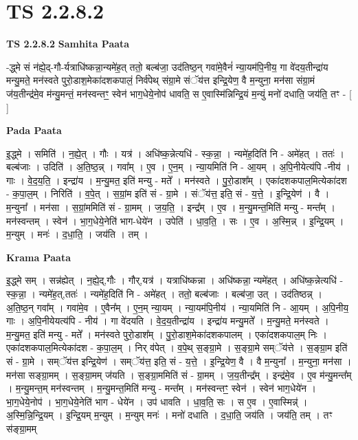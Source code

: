 \documentclass[17pt]{extarticle}
\begin{document}
\section{ TS 2.2.8.2 }

\textbf{TS 2.2.8.2 } \newline
\textbf{Samhita Paata} \newline

-द्ध्मे सं न॑ह्ये॒द्-गौ-र्यत्राधि॑ष्कन्ना॒न्यमे॑ह॒त् ततो॒ बल्ब॑जा॒ उद॑तिष्ठ॒न् गवा॑मे॒वैनं॑ न्या॒यम॑पि॒नीय॒ गा वे॑दय॒तीन्द्रा॑य मन्यु॒मते॒ मन॑स्वते पुरो॒डाश॒मेका॑दशकपालं॒ निर्व॑पेथ् संग्रा॒मे संॅय॑त्त इन्द्रि॒येण॒ वै म॒न्युना॒ मन॑सा संग्रा॒मं ज॑य॒तीन्द्र॑मे॒व म॑न्यु॒मन्तं॒ मन॑स्वन्तꣳ॒॒ स्वेन॑ भाग॒धेये॒नोप॑ धावति॒ स ए॒वास्मि॑न्निन्द्रि॒यं म॒न्युं मनो॑ दधाति॒ जय॑ति॒ तꣳ - [  ] \newline

\textbf{Pada Paata} \newline

इ॒द्ध्मे । समिति॑ । न॒ह्ये॒त् । गौः । यत्र॑ । अधि॑ष्क॒न्नेत्यधि॑ - स्क॒न्ना॒ । न्यमे॑ह॒दिति॑ नि - अमे॑हत् । ततः॑ । बल्ब॑जाः । उदिति॑ । अ॒ति॒ष्ठ॒न्न् । गवा᳚म् । ए॒व । ए॒न॒म् । न्या॒यमिति॑ नि - आ॒यम् । अ॒पि॒नीयेत्य॑पि -नीय॑ । गाः । वे॒द॒य॒ति॒ । इन्द्रा॑य । म॒न्यु॒मत॒ इति॑ मन्यु - मते᳚ । मन॑स्वते । पु॒रो॒डाश᳚म् । एका॑दशकपाल॒मित्येका॑दश - क॒पा॒ल॒म् । निरिति॑ । व॒पे॒त् । स॒ग्रां॒म इति॑ सं - ग्रा॒मे । संॅय॑त्त॒ इति॒ सं - य॒त्ते॒ । इ॒न्द्रि॒येण॑ । वै । म॒न्युना᳚ । मन॑सा । स॒ग्रां॒ममिति॑ सं - ग्रा॒मम् । ज॒य॒ति॒ । इन्द्र᳚म् । ए॒व । म॒न्यु॒मन्त॒मिति॑ मन्यु - मन्त᳚म् । मन॑स्वन्तम् । स्वेन॑ । भा॒ग॒धेये॒नेति॑ भाग-धेये॑न । उपेति॑ । धा॒व॒ति॒ । सः । ए॒व । अ॒स्मि॒न्न् । इ॒न्द्रि॒यम् । म॒न्युम् । मनः॑ । द॒धा॒ति॒ । जय॑ति । तम् ।  \newline


\textbf{Krama Paata} \newline

इ॒द्ध्मे सम् । सन्न॑ह्येत् । न॒ह्ये॒द्,गौः । गौर्,यत्र॑ । यत्राधि॑ष्कन्ना । अधि॑ष्कन्ना॒ न्यमे॑हत् । अधि॑ष्क॒न्नेत्यधि॑ - स्क॒न्ना॒ । न्यमे॑ह॒त्,ततः॑ । न्यमे॑ह॒दिति॑ नि - अमे॑हत् । ततो॒ बल्ब॑जाः । बल्ब॑जा॒ उत् । उद॑तिष्ठन्न् । अ॒ति॒ष्ठ॒न् गवा᳚म् । गवा॑मे॒व । ए॒वैन᳚म् । ए॒न॒म् न्या॒यम् । न्या॒यम॑पि॒नीय॑ । न्या॒यमिति॑ नि - आ॒यम् । अ॒पि॒नीय॒ गाः । अ॒पि॒नीयेयत्य॑पि - नीय॑ । गा वे॑दयति । वे॒द॒य॒तीन्द्रा॑य । इन्द्रा॑य मन्यु॒मते᳚ । म॒न्यु॒मते॒ मन॑स्वते । म॒न्यु॒मत॒ इति॑ मन्यु - मते᳚ । मन॑स्वते पुरो॒डाश᳚म् । पु॒रो॒डाश॒मेका॑दशकपालम् । एका॑दशकपाल॒म् निः । एका॑दशकपाल॒मित्येका॑दश - क॒पा॒ल॒म् । निर् व॑पेत् । व॒पे॒थ् स॒ङ्ग्रा॒मे । स॒ङ्ग्रा॒मे सम्ॅय॑त्ते । स॒ङ्ग्रा॒म इति॑ सं - ग्रा॒मे । सम्ॅय॑त्त इन्द्रि॒येण॑ । सम्ॅय॑त्त॒ इति॒ सं - य॒त्ते॒ । इ॒न्द्रि॒येण॒ वै । वै म॒न्युना᳚ । म॒न्युना॒ मन॑सा । मन॑सा सङ्ग्रा॒मम् । स॒ङ्ग्रा॒मम् ज॑यति । स॒ङ्ग्रा॒ममिति॑ सं - ग्रा॒मम् । ज॒य॒तीन्द्र᳚म् । इन्द्र॑मे॒व । ए॒व म॑न्यु॒मन्त᳚म् । म॒न्यु॒मन्त॒म् मन॑स्वन्तम् । म॒न्यु॒मन्त॒मिति॑ मन्यु - मन्त᳚म् । मन॑स्वन्तꣳ॒॒ स्वेन॑ । स्वेन॑ भाग॒धेये॑न । भा॒ग॒धेये॒नोप॑ । भा॒ग॒धेये॒नेति॑ भाग - धेये॑न । उप॑ धावति । धा॒व॒ति॒ सः । स ए॒व । ए॒वास्मिन्न्॑ । अ॒स्मि॒न्नि॒न्द्रि॒यम् । इ॒न्द्रि॒यम् म॒न्युम् । म॒न्युम् मनः॑ । मनो॑ दधाति । द॒धा॒ति॒ जय॑ति । जय॑ति॒ तम् । तꣳ स॑ङ्ग्रा॒मम् \newline
\end{document}
